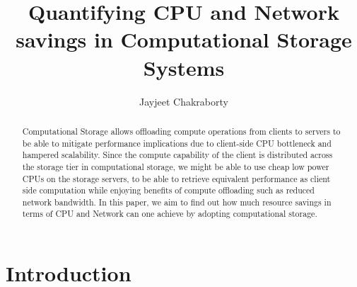 \documentclass[11pt]{article}
\title{Quantifying CPU and Network savings in Computational Storage Systems}
\author{Jayjeet Chakraborty}
\begin{document}
\maketitle

\begin{abstract}
Computational Storage allows offloading compute operations from clients to servers to be able to mitigate performance implications due to client-side CPU bottleneck and hampered scalability. Since the compute capability of the client is distributed across the storage tier in computational storage, we might be able to use cheap low power CPUs on the storage servers, to be able to retrieve equivalent performance as client side computation while enjoying benefits of compute offloading such as reduced network bandwidth. In this paper, we aim to find out how much resource savings in terms of CPU and Network can one achieve by adopting computational storage. 
\end{abstract}

\section{Introduction}
\end{document}
